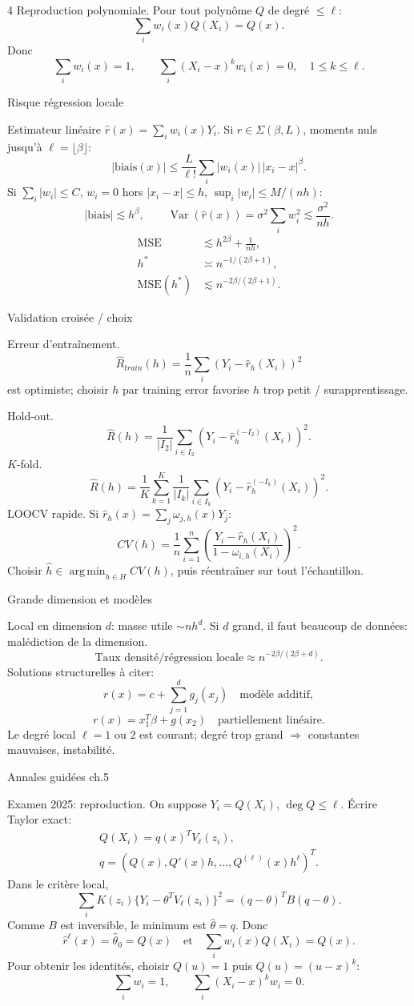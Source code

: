 \documentclass[10pt]{article}
\newcommand{\V}{\operatorname{Var}}
\newcommand{\argmin}{\operatorname*{arg\,min}}
\newcommand{\boxhead}[1]{%
  \vspace{2pt}\par\noindent #1\par\vspace{1pt}}
\newcommand{\tinytitle}[1]{#1.}
\begin{document}
\begin{multicols*}{4}
\tinytitle{Reproduction polynomiale}
Pour tout polynôme \(Q\) de degré \(\le\ell\):
\[
\sum_iw_i(x)Q(X_i)=Q(x).
\]
Donc
\[
\sum_iw_i(x)=1,\qquad
\sum_i(X_i-x)^kw_i(x)=0,\quad 1\le k\le\ell.
\]

\boxhead{Risque régression locale}
Estimateur linéaire \(\widehat r(x)=\sum_iw_i(x)Y_i\). Si \(r\in\Sigma(\beta,L)\), moments nuls jusqu'à \(\ell=\lfloor\beta\rfloor\):
\[
|\mathrm{biais}(x)|
\le \frac{L}{\ell!}\sum_i|w_i(x)|\,|x_i-x|^\beta.
\]
Si \(\sum_i|w_i|\le C\), \(w_i=0\) hors \(|x_i-x|\le h\), \(\sup_i|w_i|\le M/(nh)\):
\[
|\mathrm{biais}|\lesssim h^\beta,\qquad
\V(\widehat r(x))=\sigma^2\sum_iw_i^2\lesssim \frac{\sigma^2}{nh}.
\]
\[
\begin{aligned}
\mathrm{MSE}&\lesssim h^{2\beta}+\frac1{nh},\\
h^*&\asymp n^{-1/(2\beta+1)},\\
\mathrm{MSE}(h^*)&\lesssim n^{-2\beta/(2\beta+1)}.
\end{aligned}
\]

\boxhead{Validation croisée / choix}
\tinytitle{Erreur d'entraînement}
\[
\widehat R_{train}(h)=\frac1n\sum_i(Y_i-\widehat r_h(X_i))^2
\]
est optimiste; choisir \(h\) par training error favorise \(h\) trop petit / surapprentissage.

\tinytitle{Hold-out}
\[
\widehat R(h)=\frac1{|I_2|}\sum_{i\in I_2}
(Y_i-\widehat r_h^{(-I_2)}(X_i))^2.
\]
\tinytitle{\(K\)-fold}
\[
\widehat R(h)=\frac1K\sum_{k=1}^K
\frac1{|I_k|}\sum_{i\in I_k}(Y_i-\widehat r_h^{(-I_k)}(X_i))^2.
\]
\tinytitle{LOOCV rapide} Si \(\widehat r_h(x)=\sum_j\omega_{j,h}(x)Y_j\):
\[
CV(h)=\frac1n\sum_{i=1}^n
\left(\frac{Y_i-\widehat r_h(X_i)}
{1-\omega_{i,h}(X_i)}\right)^2.
\]
Choisir \(\widehat h\in\argmin_{h\in H}CV(h)\), puis réentraîner sur tout l'échantillon.

\boxhead{Grande dimension et modèles}
Local en dimension \(d\): masse utile \(\sim nh^d\). Si \(d\) grand, il faut beaucoup de données: malédiction de la dimension.
\[
\text{Taux densité/régression locale}\approx n^{-2\beta/(2\beta+d)}.
\]
Solutions structurelles à citer:
\[
r(x)=c+\sum_{j=1}^dg_j(x_j)
\quad\text{modèle additif},
\]
\[
r(x)=x_1^T\beta+g(x_2)
\quad\text{partiellement linéaire}.
\]
Le degré local \(\ell=1\) ou \(2\) est courant; degré trop grand \(\Rightarrow\) constantes mauvaises, instabilité.

\boxhead{Annales guidées ch.5}
\tinytitle{Examen 2025: reproduction}
On suppose \(Y_i=Q(X_i)\), \(\deg Q\le\ell\). Écrire Taylor exact:
\[
\begin{gathered}
Q(X_i)=q(x)^TV_\ell(z_i),\\
q=(Q(x),Q'(x)h,\ldots,Q^{(\ell)}(x)h^\ell)^T.
\end{gathered}
\]
Dans le critère local,
\[
\sum_iK(z_i)\{Y_i-\theta^TV_\ell(z_i)\}^2
= (q-\theta)^TB(q-\theta).
\]
Comme \(B\) est inversible, le minimum est \(\widehat\theta=q\). Donc
\[
\widehat r^\ell(x)=\widehat\theta_0=Q(x)
\quad\text{et}\quad
\sum_iw_i(x)Q(X_i)=Q(x).
\]
Pour obtenir les identités, choisir \(Q(u)=1\) puis \(Q(u)=(u-x)^k\):
\[
\sum_iw_i=1,\qquad
\sum_i(X_i-x)^kw_i=0.
\]


\end{multicols*}
\end{document}
